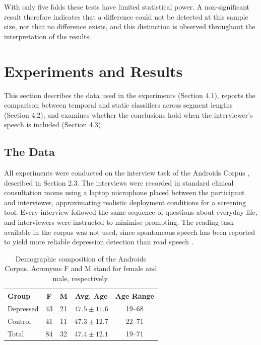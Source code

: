 \documentclass{mproj}
\begin{document}
With only five folds these tests have limited statistical power. A non-significant result therefore indicates that a difference could not be detected at this sample size, not that no difference exists, and this distinction is observed throughout the interpretation of the results.

\chapter{Experiments and Results}\label{results}

This section describes the data used in the experiments (Section 4.1), reports the comparison between temporal and static classifiers across segment lengths (Section 4.2), and examines whether the conclusions hold when the interviewer's speech is included (Section 4.3).

\section{The Data}\label{sec:data}

All experiments were conducted on the interview task of the Androids Corpus \cite{tao2023androids}, described in Section 2.3. The interviews were recorded in standard clinical consultation rooms using a laptop microphone placed between the participant and interviewer, approximating realistic deployment conditions for a screening tool. Every interview followed the same sequence of questions about everyday life, and interviewers were instructed to minimise prompting. The reading task available in the corpus was not used, since spontaneous speech has been reported to yield more reliable depression detection than read speech \cite{alghowinem2013}.

\begin{table}[htbp]
  \centering
  \caption{Demographic composition of the Androids Corpus. Acronyms F and M
  stand for female and male, respectively.}
  \label{tab:demographics}
  \begin{tabular}{lcccc}
    \toprule
    Group     & F  & M  & Avg. Age        & Age Range \\
    \midrule
    Depressed & 43 & 21 & $47.5 \pm 11.6$ & 19--68 \\
    Control   & 41 & 11 & $47.3 \pm 12.7$ & 22--71 \\
    \midrule
    Total     & 84 & 32 & $47.4 \pm 12.1$ & 19--71 \\
    \bottomrule
  \end{tabular}
\end{table}
\end{document}
